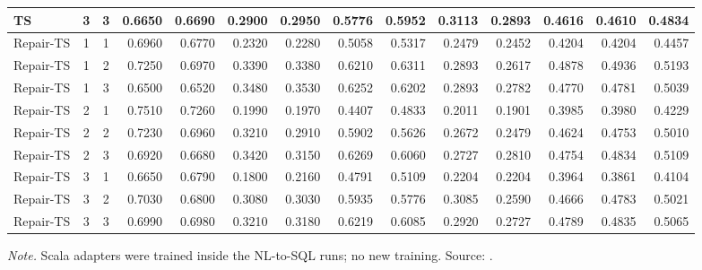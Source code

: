 {\begin{longtable}{@{}lccrrrrrrrrrrr@{}}
TS & 3 & 3 & 0.6650 & 0.6690 & 0.2900 & 0.2950 & 0.5776 & 0.5952 & 0.3113 & 0.2893 & 0.4616 & 0.4610 & 0.4834\\
\midrule
Repair-TS & 1 & 1 & 0.6960 & 0.6770 & 0.2320 & 0.2280 & 0.5058 & 0.5317 & 0.2479 & 0.2452 & 0.4204 & 0.4204 & 0.4457\\
Repair-TS & 1 & 2 & 0.7250 & 0.6970 & 0.3390 & 0.3380 & 0.6210 & 0.6311 & 0.2893 & 0.2617 & 0.4878 & 0.4936 & 0.5193\\
Repair-TS & 1 & 3 & 0.6500 & 0.6520 & 0.3480 & 0.3530 & 0.6252 & 0.6202 & 0.2893 & 0.2782 & 0.4770 & 0.4781 & 0.5039\\
Repair-TS & 2 & 1 & 0.7510 & 0.7260 & 0.1990 & 0.1970 & 0.4407 & 0.4833 & 0.2011 & 0.1901 & 0.3985 & 0.3980 & 0.4229\\
Repair-TS & 2 & 2 & 0.7230 & 0.6960 & 0.3210 & 0.2910 & 0.5902 & 0.5626 & 0.2672 & 0.2479 & 0.4624 & 0.4753 & 0.5010\\
Repair-TS & 2 & 3 & 0.6920 & 0.6680 & 0.3420 & 0.3150 & 0.6269 & 0.6060 & 0.2727 & 0.2810 & 0.4754 & 0.4834 & 0.5109\\
Repair-TS & 3 & 1 & 0.6650 & 0.6790 & 0.1800 & 0.2160 & 0.4791 & 0.5109 & 0.2204 & 0.2204 & 0.3964 & 0.3861 & 0.4104\\
Repair-TS & 3 & 2 & 0.7030 & 0.6800 & 0.3080 & 0.3030 & 0.5935 & 0.5776 & 0.3085 & 0.2590 & 0.4666 & 0.4783 & 0.5021\\
Repair-TS & 3 & 3 & 0.6990 & 0.6980 & 0.3210 & 0.3180 & 0.6219 & 0.6085 & 0.2920 & 0.2727 & 0.4789 & 0.4835 & 0.5065\\
\end{longtable}
}
\vspace{-0.6\baselineskip}
{\footnotesize\color{slate}\textit{Note.} Scala adapters were trained inside the NL-to-SQL runs; no new training. Source: .\par}
\medskip
